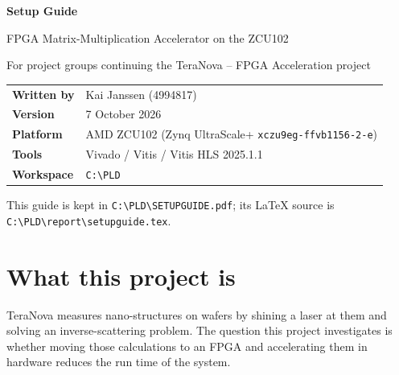 \documentclass[11pt,a4paper]{article}
\newcommand{\code}[1]{\texttt{#1}}
\newcommand{\bs}{\textbackslash\allowbreak{}}
\renewcommand{\_}{\oldunderscore\allowbreak{}}
\begin{document}
\begin{titlepage}
\centering
\vspace*{3cm}
{\LARGE\bfseries Setup Guide\par}
\vspace{0.5cm}
{\Large FPGA Matrix-Multiplication Accelerator on the ZCU102\par}
\vspace{0.3cm}
{\large For project groups continuing the TeraNova -- FPGA Acceleration project\par}
\vspace{2cm}
\begin{tabular}{@{}ll@{}}
\textbf{Written by}  & Kai Janssen (4994817) \\
\textbf{Version}     & 7 October 2026 \\
\textbf{Platform}    & AMD ZCU102 (Zynq UltraScale+ \code{xczu9eg-ffvb1156-2-e}) \\
\textbf{Tools}       & Vivado / Vitis / Vitis HLS 2025.1.1 \\
\textbf{Workspace}   & \code{C:\bs PLD} \\
\end{tabular}
\vfill
{\small This guide is kept in \code{C:\bs PLD\bs SETUP\_GUIDE.pdf}; its \LaTeX{} source is \code{C:\bs PLD\bs report\bs setup\_guide.tex}.\par}
\end{titlepage}

\tableofcontents
\newpage

\section{What this project is}
TeraNova measures nano-structures on wafers by shining a laser at them and solving an inverse-scattering problem. The question this project investigates is whether moving those calculations to an FPGA and accelerating them in hardware reduces the run time of the system.
\end{document}
